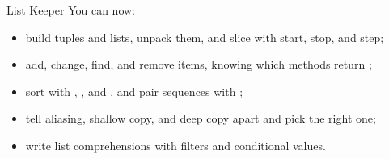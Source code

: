 \begin{achievement}{List Keeper}
You can now:
\begin{itemize}
\item build tuples and lists, unpack them, and slice with start, stop, and step;
\item add, change, find, and remove items, knowing which methods return ;
\item sort with , , and , and pair sequences with ;
\item tell aliasing, shallow copy, and deep copy apart and pick the right one;
\item write list comprehensions with filters and conditional values.
\end{itemize}
\end{achievement}

